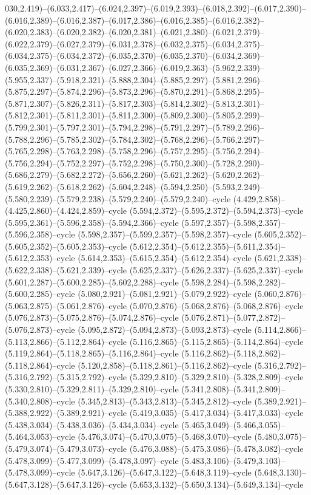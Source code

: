 030,2.419)--(6.033,2.417)--(6.024,2.397)--(6.019,2.393)--(6.018,2.392)--(6.017,2.390)--(6.016,2.389)--(6.016,2.387)--(6.017,2.386)--(6.016,2.385)--(6.016,2.382)--(6.020,2.383)--(6.020,2.382)--(6.020,2.381)--(6.021,2.380)--(6.021,2.379)--(6.022,2.379)--(6.027,2.379)--(6.031,2.378)--(6.032,2.375)--(6.034,2.375)--(6.034,2.375)--(6.034,2.372)--(6.035,2.370)--(6.035,2.370)--(6.034,2.369)--(6.035,2.369)--(6.031,2.367)--(6.027,2.366)--(6.019,2.363)--(5.962,2.339)--(5.955,2.337)--(5.918,2.321)--(5.888,2.304)--(5.885,2.297)--(5.881,2.296)--(5.875,2.297)--(5.874,2.296)--(5.873,2.296)--(5.870,2.291)--(5.868,2.295)--(5.871,2.307)--(5.826,2.311)--(5.817,2.303)--(5.814,2.302)--(5.813,2.301)--(5.812,2.301)--(5.811,2.301)--(5.811,2.300)--(5.809,2.300)--(5.805,2.299)--(5.799,2.301)--(5.797,2.301)--(5.794,2.298)--(5.791,2.297)--(5.789,2.296)--(5.788,2.296)--(5.785,2.302)--(5.784,2.302)--(5.768,2.296)--(5.766,2.297)--(5.765,2.298)--(5.763,2.298)--(5.758,2.296)--(5.757,2.295)--(5.756,2.294)--(5.756,2.294)--(5.752,2.297)--(5.752,2.298)--(5.750,2.300)--(5.728,2.290)--(5.686,2.279)--(5.682,2.272)--(5.656,2.260)--(5.621,2.262)--(5.620,2.262)--(5.619,2.262)--(5.618,2.262)--(5.604,2.248)--(5.594,2.250)--(5.593,2.249)--(5.580,2.239)--(5.579,2.238)--(5.579,2.240)--(5.579,2.240)--cycle (4.429,2.858)--(4.425,2.860)--(4.424,2.859)--cycle (5.594,2.372)--(5.595,2.372)--(5.594,2.373)--cycle (5.595,2.361)--(5.596,2.358)--(5.594,2.366)--cycle (5.597,2.357)--(5.598,2.357)--(5.596,2.358)--cycle (5.598,2.357)--(5.599,2.357)--(5.598,2.357)--cycle (5.605,2.352)--(5.605,2.352)--(5.605,2.353)--cycle (5.612,2.354)--(5.612,2.355)--(5.611,2.354)--(5.612,2.353)--cycle (5.614,2.353)--(5.615,2.354)--(5.612,2.354)--cycle (5.621,2.338)--(5.622,2.338)--(5.621,2.339)--cycle (5.625,2.337)--(5.626,2.337)--(5.625,2.337)--cycle (5.601,2.287)--(5.600,2.285)--(5.602,2.288)--cycle (5.598,2.284)--(5.598,2.282)--(5.600,2.285)--cycle (5.080,2.921)--(5.081,2.921)--(5.079,2.922)--cycle (5.060,2.876)--(5.063,2.875)--(5.061,2.876)--cycle (5.070,2.876)--(5.068,2.876)--(5.068,2.876)--cycle (5.076,2.873)--(5.075,2.876)--(5.074,2.876)--cycle (5.076,2.871)--(5.077,2.872)--(5.076,2.873)--cycle (5.095,2.872)--(5.094,2.873)--(5.093,2.873)--cycle (5.114,2.866)--(5.113,2.866)--(5.112,2.864)--cycle (5.116,2.865)--(5.115,2.865)--(5.114,2.864)--cycle (5.119,2.864)--(5.118,2.865)--(5.116,2.864)--cycle (5.116,2.862)--(5.118,2.862)--(5.118,2.864)--cycle (5.120,2.858)--(5.118,2.861)--(5.116,2.862)--cycle (5.316,2.792)--(5.316,2.792)--(5.315,2.792)--cycle (5.329,2.810)--(5.329,2.810)--(5.328,2.809)--cycle (5.330,2.810)--(5.329,2.811)--(5.329,2.810)--cycle (5.341,2.808)--(5.341,2.809)--(5.340,2.808)--cycle (5.345,2.813)--(5.343,2.813)--(5.345,2.812)--cycle (5.389,2.921)--(5.388,2.922)--(5.389,2.921)--cycle (5.419,3.035)--(5.417,3.034)--(5.417,3.033)--cycle (5.438,3.034)--(5.438,3.036)--(5.434,3.034)--cycle (5.465,3.049)--(5.466,3.055)--(5.464,3.053)--cycle (5.476,3.074)--(5.470,3.075)--(5.468,3.070)--cycle (5.480,3.075)--(5.479,3.074)--(5.479,3.073)--cycle (5.476,3.088)--(5.475,3.086)--(5.478,3.082)--cycle (5.478,3.099)--(5.477,3.099)--(5.478,3.097)--cycle (5.483,3.106)--(5.479,3.103)--(5.478,3.099)--cycle (5.647,3.126)--(5.647,3.122)--(5.648,3.119)--cycle (5.648,3.130)--(5.647,3.128)--(5.647,3.126)--cycle (5.653,3.132)--(5.650,3.134)--(5.649,3.134)--cycle 